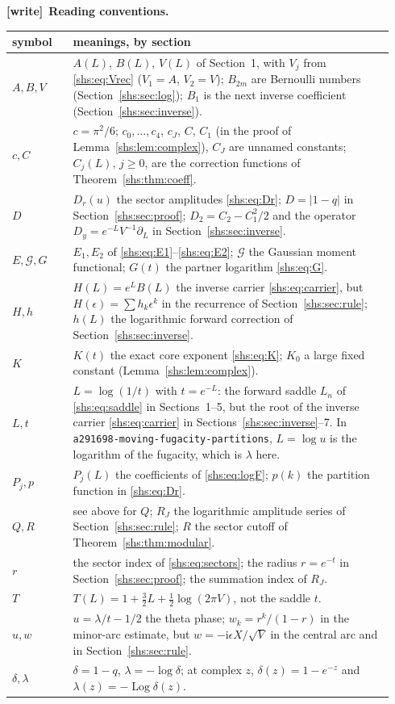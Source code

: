 \documentclass[11pt]{article}
\newcommand{\ii}{\mathrm{i}}
\newcommand{\Log}{\operatorname{Log}}
\theoremstyle{definition}
\theoremstyle{plain}
\newenvironment{writenote}[1][]{\par\smallskip\begingroup\small
 \noindent\textbf{[write]}\if\relax\detokenize{#1}\relax\else~\textbf{#1.}\fi\ }%
 {\par\endgroup\smallskip}
\begin{document}
\begin{writenote}[Reading conventions]
\smallskip
\noindent\begin{tabular}{@{}>{\raggedright\arraybackslash}p{0.15\linewidth}
 >{\raggedright\arraybackslash}p{0.79\linewidth}@{}}
\toprule
symbol & meanings, by section \\
\midrule
$A,B,V$ & $A(L)$, $B(L)$, $V(L)$ of Section~1, with $V_j$ from
 \eqref{shs:eq:Vrec} ($V_1=A$, $V_2=V$); $B_{2m}$ are Bernoulli numbers
 (Section~\ref{shs:sec:log}); $B_1$ is the next inverse coefficient
 (Section~\ref{shs:sec:inverse}). \\
$c,C$ & $c=\pi^2/6$; $c_0,\dots,c_4$, $c_J$, $C$, $C_1$ (in the proof of
 Lemma~\ref{shs:lem:complex}), $C_J$ are unnamed constants; $C_j(L)$,
 $j\ge0$, are the correction functions of Theorem~\ref{shs:thm:coeff}. \\
$D$ & $D_r(u)$ the sector amplitudes \eqref{shs:eq:Dr}; $D=|1-q|$ in
 Section~\ref{shs:sec:proof}; $D_2=C_2-C_1^2/2$ and the operator
 $D_y=e^{-L}V^{-1}\partial_L$ in Section~\ref{shs:sec:inverse}. \\
$E,\mathcal G,G$ & $E_1,E_2$ of \eqref{shs:eq:E1}--\eqref{shs:eq:E2};
 $\mathcal G$ the Gaussian moment functional; $G(t)$ the partner
 logarithm \eqref{shs:eq:G}. \\
$H,h$ & $H(L)=e^LB(L)$ the inverse carrier \eqref{shs:eq:carrier}, but
 $H(\epsilon)=\sum h_k\epsilon^k$ in the recurrence of
 Section~\ref{shs:sec:rule}; $h(L)$ the logarithmic forward correction of
 Section~\ref{shs:sec:inverse}. \\
$K$ & $K(t)$ the exact core exponent \eqref{shs:eq:K}; $K_0$ a large
 fixed constant (Lemma~\ref{shs:lem:complex}). \\
$L,t$ & $L=\log(1/t)$ with $t=e^{-L}$: the forward saddle $L_n$ of
 \eqref{shs:eq:saddle} in Sections~1--5, but the root of the inverse
 carrier \eqref{shs:eq:carrier} in Sections~\ref{shs:sec:inverse}--7.
 In \nolinkurl{a291698-moving-fugacity-partitions}, $L=\log u$ is the
 logarithm of the fugacity, which is $\lambda$ here. \\
$P_j,p$ & $P_j(L)$ the coefficients of \eqref{shs:eq:logF}; $p(k)$ the
 partition function in \eqref{shs:eq:Dr}. \\
$Q,R$ & see above for $Q$; $R_J$ the logarithmic amplitude series of
 Section~\ref{shs:sec:rule}; $R$ the sector cutoff of
 Theorem~\ref{shs:thm:modular}. \\
$r$ & the sector index of \eqref{shs:eq:sectors}; the radius $r=e^{-t}$
 in Section~\ref{shs:sec:proof}; the summation index of $R_J$. \\
$T$ & $T(L)=1+\tfrac32L+\tfrac12\log(2\pi V)$, not the saddle $t$. \\
$u,w$ & $u=\lambda/t-1/2$ the theta phase; $w_k=r^k/(1-r)$ in the
 minor-arc estimate, but $w=-\ii\epsilon X/\sqrt V$ in the central arc and
 in Section~\ref{shs:sec:rule}. \\
$\delta,\lambda$ & $\delta=1-q$, $\lambda=-\log\delta$; at complex $z$,
 $\delta(z)=1-e^{-z}$ and $\lambda(z)=-\Log\delta(z)$. \\
\bottomrule
\end{tabular}
\end{writenote}
\end{document}
